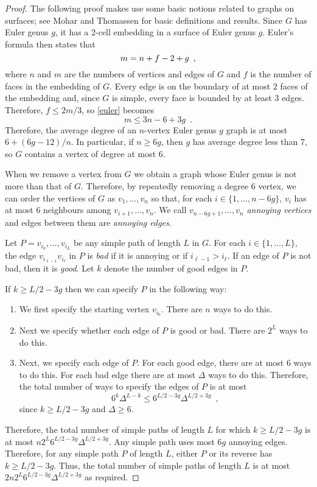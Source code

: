\documentclass{patmorin}
\begin{document}
\begin{proof}
   The following proof makes use some basic notions related to graphs
   on surfaces; see Mohar and Thomassen \cite{mohar.thomassen:graphs} for basic
   definitions and results.
   Since $G$ has Euler genus $g$, it has a 2-cell embedding in a surface
   of Euler genus $g$.  Euler's formula then states that 
   \begin{equation}
      m = n+f-2+g \enspace ,  \eqlabel{euler}
   \end{equation}
   where $n$ and $m$ are the numbers of vertices and edges of
   $G$ and $f$ is the number of faces in the embedding of $G$.  
   Every edge is on the boundary of at most 2 faces of the embedding
   and, since $G$ is simple, 
   every face is
   bounded by at least 3 edges.  Therefore, $f \le 2m/3$, so \eqref{euler}
   becomes
   \[
       m\le 3n-6+3g \enspace .
   \]
   Therefore, the average degree of an $n$-vertex Euler genus $g$ graph
   is at most $6+(6g-12)/n$.  In particular, if $n \ge 6g$, then $g$
   has average degree less than 7, so $G$ contains a vertex of degree
   at most $6$.
  
   When we remove a vertex from $G$ we obtain a graph whose Euler genus is
   not more than that of $G$.  Therefore, by repeatedly removing a degree
   6 vertex, we can order the vertices of $G$ as $v_1,\ldots,v_n$ so that,
   for each $i\in\{1,\ldots,n-6g\}$, $v_i$ has at most 6 neighbours among
   $v_{i+1},\ldots,v_n$.  We call $v_{n-6g+1},\ldots,v_n$ \emph{annoying
   vertices} and edges between them are \emph{annoying edges}.

   Let $P=v_{i_0},\ldots,v_{i_L}$ be any simple path of length $L$ in $G$.
   For each $i\in\{1,\ldots,L\}$, the edge $v_{i_{\ell-1}}v_{i_{\ell}}$
   in $P$ is \emph{bad} if it is annoying or if $i_{\ell-1}>i_{\ell}$. If
   an edge of $P$ is not bad, then it is \emph{good}.  Let $k$ denote
   the number of good edges in $P$.

   If $k\ge L/2-3g$ then we can specify $P$ in the following way:
   \begin{enumerate}
     \item We first specify the starting vertex $v_{i_0}$.  There are $n$
       ways to do this.
     \item Next we specify whether each edge of $P$ is good or bad.
       There are $2^L$ ways to do this.
     \item Next, we specify each edge of $P$.  For each good edge,
       there are at most 6 ways to do this. For each bad edge there are 
       at most $\Delta$ ways to do this.
      Therefore, the total number of ways to specify the edges of $P$ is at most
      \[   6^k\Delta^{L-k} \le 6^{L/2-3g}\Delta^{L/2+3g}  \enspace ,\]
      since $k\ge L/2-3g$ and $\Delta\ge 6$.
   \end{enumerate}
   Therefore, the total number of simple paths of length $L$ for which
   $k\ge L/2-3g$ is at most $n2^L6^{L/2-3g}\Delta^{L/2+3g}$.  Any simple
   path uses most $6g$ annoying edges.  Therefore, for any simple path
   $P$ of length $L$, either $P$ or its reverse has $k\ge L/2-3g$.
   Thus, the total number of simple paths of length $L$ is at most
   $2n2^L6^{L/2-3g}\Delta^{L/2+3g}$ as required.  



\end{proof}
\end{document}
